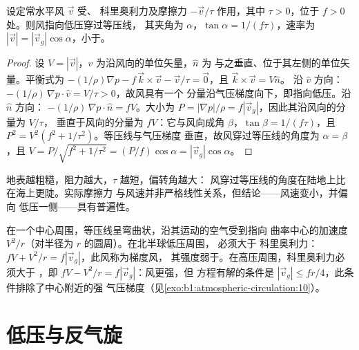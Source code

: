\begin{proposition}[摩擦使风转向低压]\label{prop:b1:atmospheric-circulation:friction}
设定常水平风 $\vec v$ 受、
科里奥利力及摩擦力 $-\vec v/\tau$ 作用，其中 $\tau > 0$，位于
 $f > 0$ 处。则风指向低压穿过等压线，
其夹角为 $\alpha$，$\tan\alpha = 1/(f\tau)$，速率为 $|\vec v| =
|\vec v_g|\cos\alpha$，小于。
\end{proposition}

\begin{proof}
设 $V = |\vec v|$，$\hat v$ 为沿风向的单位矢量，$\hat n$ 为
与之垂直、位于其左侧的单位矢量。平衡式为 $-(1/\rho)\nabla p - f\,
\vec k\times\vec v - \vec v/\tau = \vec 0$，且 $\vec k\times\vec v = V\hat n$。
沿 $\hat v$ 方向：$-(1/\rho)\,\nabla p\cdot\hat v = V/\tau > 0$，故风具有一个
分量沿气压梯度向下，即指向低压。沿 $\hat n$ 方向：
$-(1/\rho)\,\nabla p\cdot\hat n = fV$。大小为 $P =
|\nabla p|/\rho = f|\vec v_g|$，因此其沿风向的分量为 $V/\tau$，
垂直于风向的分量为 $fV$：它与风向成角 $\beta$，$\tan\beta =
1/(f\tau)$，且 $P^2 = V^2(f^2 + 1/\tau^2)$。等压线与气压梯度
垂直，故风穿过等压线的角度为 $\alpha = \beta$，且 $V = P/\sqrt{f^2 +
1/\tau^2} = (P/f)\cos\alpha = |\vec v_g|\cos\alpha$。
\end{proof}

地表越粗糙，阻力越大，$\tau$ 越短，偏转角越大：
风穿过等压线的角度在陆地上比在海上更陡。实际摩擦力
与风速并非严格线性关系，但结论——风速变小，并偏向
低压一侧——具有普遍性。

\begin{remark}[梯度风]\label{rem:b1:atmospheric-circulation:gradient}
在一个中心周围，等压线呈弯曲状，沿其运动的空气受到指向
曲率中心的加速度 $V^2/r$（对半径为 $r$ 的圆周）。在北半球低压周围，
必须大于
科里奥利力：$fV + V^2/r = f|\vec v_g|$，此风称为梯度风，
其强度弱于。在高压周围，科里奥利力必须大于
，即 $fV - V^2/r = f|\vec v_g|$：风更强，但
方程有解的条件是 $|\vec v_g| \leq fr/4$，此条件排除了中心附近的强
气压梯度（见\cref{exo:b1:atmospheric-circulation:10}）。
\end{remark}

\section{低压与反气旋}\label{sec:b1:atmospheric-circulation:cyclones}

